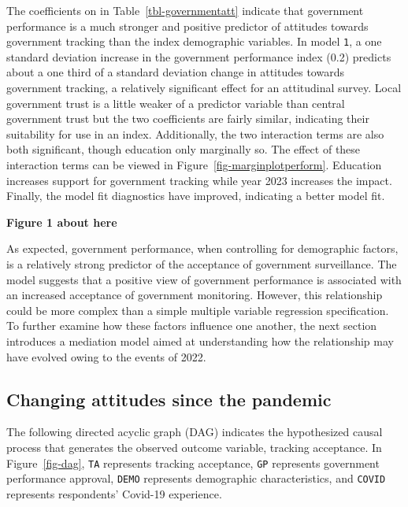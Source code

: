 \documentclass[
  letterpaper,
  DIV=11,
  numbers=noendperiod]{scrartcl}
\begin{document}
The coefficients on in Table~\ref{tbl-governmentatt} indicate that
government performance is a much stronger and positive predictor of
attitudes towards government tracking than the index demographic
variables. In model \texttt{1}, a one standard deviation increase in the
government performance index (0.2) predicts about a one third of a
standard deviation change in attitudes towards government tracking, a
relatively significant effect for an attitudinal survey. Local
government trust is a little weaker of a predictor variable than central
government trust but the two coefficients are fairly similar, indicating
their suitability for use in an index. Additionally, the two interaction
terms are also both significant, though education only marginally so.
The effect of these interaction terms can be viewed in
Figure~\ref{fig-marginplotperform}. Education increases support for
government tracking while year 2023 increases the impact. Finally, the
model fit diagnostics have improved, indicating a better model fit.

\textbf{Figure 1 about here}

As expected, government performance, when controlling for demographic
factors, is a relatively strong predictor of the acceptance of
government surveillance. The model suggests that a positive view of
government performance is associated with an increased acceptance of
government monitoring. However, this relationship could be more complex
than a simple multiple variable regression specification. To further
examine how these factors influence one another, the next section
introduces a mediation model aimed at understanding how the relationship
may have evolved owing to the events of 2022.

\subsection{Changing attitudes since the
pandemic}\label{changing-attitudes-since-the-pandemic}

The following directed acyclic graph (DAG) indicates the hypothesized
causal process that generates the observed outcome variable, tracking
acceptance. In Figure~\ref{fig-dag}, \texttt{TA} represents tracking
acceptance, \texttt{GP} represents government performance approval,
\texttt{DEMO} represents demographic characteristics, and \texttt{COVID}
represents respondents' Covid-19 experience.
\end{document}
